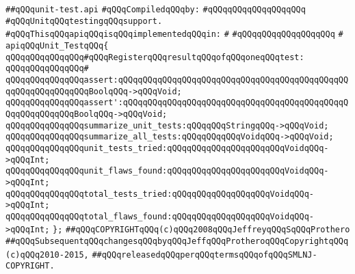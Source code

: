 \label{src/lib/src/unit-test.api}
\verb|##qQQqunit-test.api|\newline
\newline
\verb|#qQQqCompiledqQQqby:|\newline
\verb|#qQQqqQQqqQQqqQQqqQQq|\newline
\newline
\newline
\verb|#qQQqUnitqQQqtestingqQQqsupport.|\newline
\newline
\verb|#qQQqThisqQQqapiqQQqisqQQqimplementedqQQqin:|\newline
\verb|#|\newline
\verb|#qQQqqQQqqQQqqQQqqQQq|\newline
\verb|#|\newline
\verb|apiqQQqUnit_TestqQQq{|\newline
\newline
\verb|qQQqqQQqqQQqqQQq#qQQqRegisterqQQqresultqQQqofqQQqoneqQQqtest:|\newline
\verb|qQQqqQQqqQQqqQQq#|\newline
\verb|qQQqqQQqqQQqqQQqassert:qQQqqQQqqQQqqQQqqQQqqQQqqQQqqQQqqQQqqQQqqQQqqQQqqQQqqQQqqQQqqQQqBoolqQQq->qQQqVoid;|\newline
\verb|qQQqqQQqqQQqqQQqassert':qQQqqQQqqQQqqQQqqQQqqQQqqQQqqQQqqQQqqQQqqQQqqQQqqQQqqQQqqQQqBoolqQQq->qQQqVoid;|\newline
\newline
\verb|qQQqqQQqqQQqqQQqsummarize_unit_tests:qQQqqQQqStringqQQq->qQQqVoid;|\newline
\verb|qQQqqQQqqQQqqQQqsummarize_all_tests:qQQqqQQqqQQqVoidqQQq->qQQqVoid;|\newline
\newline
\verb|qQQqqQQqqQQqqQQqunit_tests_tried:qQQqqQQqqQQqqQQqqQQqqQQqVoidqQQq->qQQqInt;|\newline
\verb|qQQqqQQqqQQqqQQqunit_flaws_found:qQQqqQQqqQQqqQQqqQQqqQQqVoidqQQq->qQQqInt;|\newline
\newline
\verb|qQQqqQQqqQQqqQQqtotal_tests_tried:qQQqqQQqqQQqqQQqqQQqVoidqQQq->qQQqInt;|\newline
\verb|qQQqqQQqqQQqqQQqtotal_flaws_found:qQQqqQQqqQQqqQQqqQQqVoidqQQq->qQQqInt;|\newline
\verb|};|\newline
\newline
\newline
\verb|##qQQqCOPYRIGHTqQQq(c)qQQq2008qQQqJeffreyqQQqSqQQqProthero|\newline
\verb|##qQQqSubsequentqQQqchangesqQQqbyqQQqJeffqQQqProtheroqQQqCopyrightqQQq(c)qQQq2010-2015,|\newline
\verb|##qQQqreleasedqQQqperqQQqtermsqQQqofqQQqSMLNJ-COPYRIGHT.|\newline

